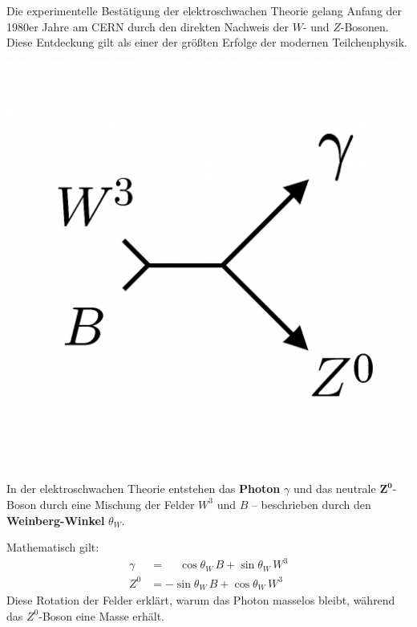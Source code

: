 Die experimentelle Bestätigung der elektroschwachen Theorie gelang Anfang der 1980er Jahre am CERN durch den direkten Nachweis der \(W\)- und \(Z\)-Bosonen.  
Diese Entdeckung gilt als einer der größten Erfolge der modernen Teilchenphysik.
\vspace{1em}
\begin{tcolorbox}[didaktikbox, title=Vom \(W^3\) und \(B\) zum Photon]
	\label{box:weinberg_mischung}
	\small
	\begin{minipage}{0.35\textwidth}
		\centering
		\includegraphics[width=\linewidth]{bilder/weinberg_mischung.png}
	\end{minipage}%
	\begin{minipage}{0.63\textwidth}
		In der elektroschwachen Theorie entstehen das \textbf{Photon} \(\gamma\) und das neutrale 
		\(\mathbf{Z^0}\)-Boson durch eine Mischung der Felder \(W^3\) und \(B\) 
		– beschrieben durch den \textbf{Weinberg-Winkel} \(\theta_W\).  
		\vspace{0.3em}
		
		Mathematisch gilt:
		\[
		\begin{aligned}
			\gamma &= \phantom{-}\cos\theta_W \, B + \sin\theta_W \, W^3 \\
			Z^0    &= -\sin\theta_W \, B + \cos\theta_W \, W^3
		\end{aligned}
		\]
		Diese Rotation der Felder erklärt, warum das Photon masselos bleibt, während 
		das \(Z^0\)-Boson eine Masse erhält.
	\end{minipage}
\end{tcolorbox}


